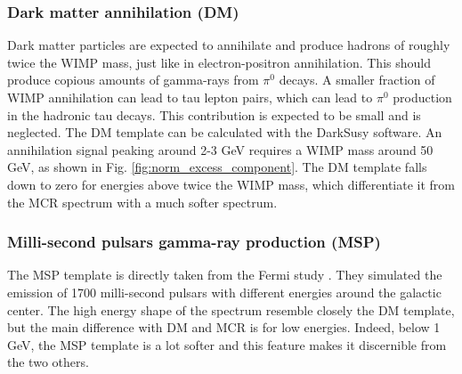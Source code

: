 %
%
%


\subsubsection{Dark matter annihilation (DM)}

Dark matter particles are expected to annihilate and produce hadrons of roughly twice the WIMP mass, just like in electron-positron annihilation. This should produce copious amounts of gamma-rays from $\pi^0$ decays. A smaller fraction of WIMP annihilation can lead to tau lepton pairs, which can lead to $\pi^0$ production in the hadronic tau decays. This contribution is expected to be small and is neglected. The DM template can be calculated with the DarkSusy software.  
An annihilation signal peaking around 2-3 GeV requires a WIMP mass around 50 GeV, as shown in Fig. \ref{fig:norm_excess_component}. 
The DM template falls down to zero for energies above twice the WIMP mass, which differentiate it from the MCR spectrum with a much softer spectrum. 

%


\subsubsection{Milli-second pulsars gamma-ray production (MSP)}

The MSP template is directly taken from the Fermi study %
. They simulated the emission of 1700 milli-second pulsars with different energies around the galactic center.
The high energy shape of the spectrum resemble closely the DM template, but the main difference with DM and MCR is for low energies. Indeed, below 1 GeV, the MSP template is a lot softer and this feature makes it discernible from the two others.

